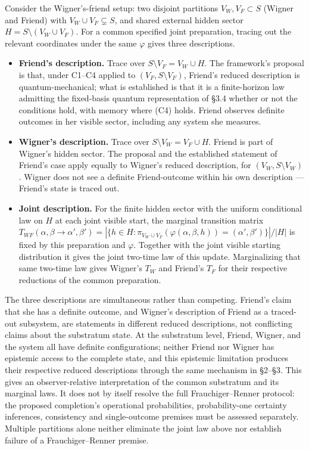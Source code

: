 \documentclass[
]{article}
\providecommand{\tightlist}{%
  \setlength{\itemsep}{0pt}\setlength{\parskip}{0pt}}
\begin{document}
Consider the Wigner's-friend setup: two disjoint partitions
\(V_W, V_F \subset S\) (Wigner and Friend) with
\(V_W \cup V_F \subsetneq S\), and shared external hidden sector
\(H = S \setminus (V_W \cup V_F)\). For a common specified joint
preparation, tracing out the relevant coordinates under the same
\(\varphi\) gives three descriptions.

\begin{itemize}
\tightlist
\item
  \textbf{Friend's description.} Trace over
  \(S \setminus V_F = V_W \cup H\). The framework's proposal is that,
  under C1--C4 applied to \((V_F, S \setminus V_F)\), Friend's reduced
  description is quantum-mechanical; what is established is that it is a
  finite-horizon law admitting the fixed-basis quantum representation of
  §3.4 whether or not the conditions hold, with memory where (C4) holds.
  Friend observes definite outcomes in her visible sector, including any
  system she measures.
\item
  \textbf{Wigner's description.} Trace over
  \(S \setminus V_W = V_F \cup H\). Friend is part of Wigner's hidden
  sector. The proposal and the established statement of Friend's case
  apply equally to Wigner's reduced description, for
  \((V_W, S \setminus V_W)\). Wigner does not see a definite
  Friend-outcome within his own description --- Friend's state is traced
  out.
\item
  \textbf{Joint description.} For the finite hidden sector with the
  uniform conditional law on \(H\) at each joint visible start, the
  marginal transition matrix
  \(T_{WF}(\alpha, \beta \to \alpha', \beta') = |\{h \in H : \pi_{V_W \cup V_F}(\varphi(\alpha, \beta, h)) = (\alpha', \beta')\}|/|H|\)
  is fixed by this preparation and \(\varphi\). Together with the joint
  visible starting distribution it gives the joint two-time law of this
  update. Marginalizing that same two-time law gives Wigner's \(T_W\)
  and Friend's \(T_F\) for their respective reductions of the common
  preparation.
\end{itemize}

The three descriptions are simultaneous rather than competing. Friend's
claim that she has a definite outcome, and Wigner's description of
Friend as a traced-out subsystem, are statements in different reduced
descriptions, not conflicting claims about the substratum state. At the
substratum level, Friend, Wigner, and the system all have definite
configurations; neither Friend nor Wigner has epistemic access to the
complete state, and this epistemic limitation produces their respective
reduced descriptions through the same mechanism in §2--§3. This gives an
observer-relative interpretation of the common substratum and its
marginal laws. It does not by itself resolve the full Frauchiger--Renner
protocol: the proposed completion's operational probabilities,
probability-one certainty inferences, consistency and single-outcome
premises must be assessed separately. Multiple partitions alone neither
eliminate the joint law above nor establish failure of a
Frauchiger--Renner premise.
\end{document}
